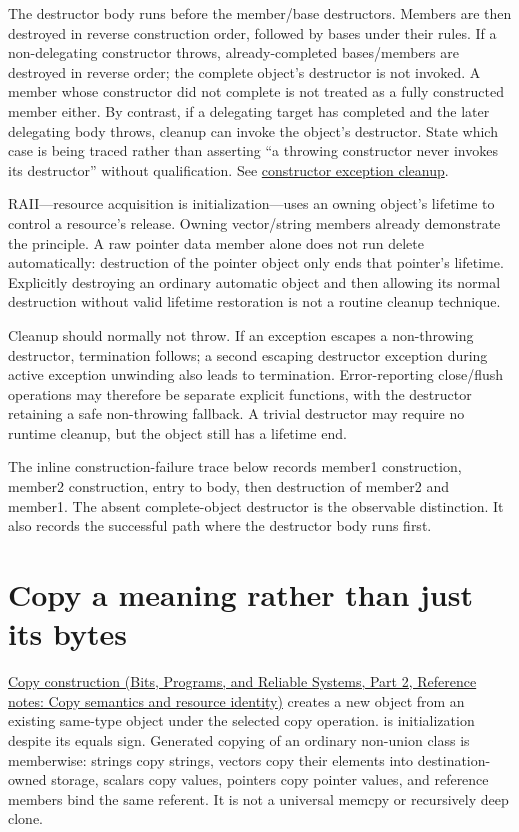 The destructor body runs before the member/base destructors. Members are then destroyed in reverse construction order, followed by bases under their rules. If a non-delegating constructor throws, already-completed bases/members are destroyed in reverse order; the complete object's destructor is not invoked. A member whose constructor did not complete is not treated as a fully constructed member either. By contrast, if a delegating target has completed and the later delegating body throws, cleanup can invoke the object's destructor. State which case is being traced rather than asserting ``a throwing constructor never invokes its destructor'' without qualification. See \href{https://eel.is/c++draft/except.ctor}{constructor exception cleanup}.

RAII---resource acquisition is initialization---uses an owning object's lifetime to control a resource's release. Owning vector/string members already demonstrate the principle. A raw pointer data member alone does not run delete automatically: destruction of the pointer object only ends that pointer's lifetime. Explicitly destroying an ordinary automatic object and then allowing its normal destruction without valid lifetime restoration is not a routine cleanup technique.

Cleanup should normally not throw. If an exception escapes a non-throwing destructor, termination follows; a second escaping destructor exception during active exception unwinding also leads to termination. Error-reporting close/flush operations may therefore be separate explicit functions, with the destructor retaining a safe non-throwing fallback. A trivial destructor may require no runtime cleanup, but the object still has a lifetime end.

The inline construction-failure trace below records member1 construction, member2 construction, entry to body, then destruction of member2 and member1. The absent complete-object destructor is the observable distinction. It also records the successful path where the destructor body runs first.

\section{Copy a meaning rather than just its bytes}\label{05-engine-i-ch003-copy-a-meaning-rather-than-just-its-bytes}

\hypertarget{05-engine-i-ch003-copy-a-meaning-rather-than-just-its-bytes}{}

\href{../01-Bits-Programs-and-Reliable-Systems-P02/main.pdf\#nameddest=appendix-1340cd1ce582}{Copy construction (Bits, Programs, and Reliable Systems, Part 2, Reference notes: Copy semantics and resource identity)} creates a new object from an existing same-type object under the selected copy operation.  is initialization despite its equals sign. Generated copying of an ordinary non-union class is memberwise: strings copy strings, vectors copy their elements into destination-owned storage, scalars copy values, pointers copy pointer values, and reference members bind the same referent. It is not a universal memcpy or recursively deep clone.

